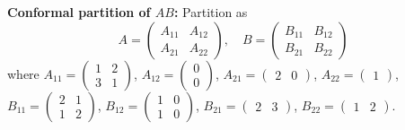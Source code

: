 \documentclass[12pt,a3paper]{article}
\begin{document}
\begin{tcolorbox}
\textbf{Conformal partition of $AB$:} Partition as
\[
A = \left(\begin{array}{cc} A_{11} & A_{12} \\ A_{21} & A_{22} \end{array}\right),\quad
B = \left(\begin{array}{cc} B_{11} & B_{12} \\ B_{21} & B_{22} \end{array}\right)
\]
where $A_{11}=\begin{pmatrix}1&2\\3&1\end{pmatrix}$, $A_{12}=\begin{pmatrix}0\\0\end{pmatrix}$, $A_{21}=\begin{pmatrix}2&0\end{pmatrix}$, $A_{22}=\begin{pmatrix}1\end{pmatrix}$,
$B_{11}=\begin{pmatrix}2&1\\1&2\end{pmatrix}$, $B_{12}=\begin{pmatrix}1&0\\1&0\end{pmatrix}$,
$B_{21}=\begin{pmatrix}2&3\end{pmatrix}$, $B_{22}=\begin{pmatrix}1&2\end{pmatrix}$.
 

\end{tcolorbox}
\end{document}
